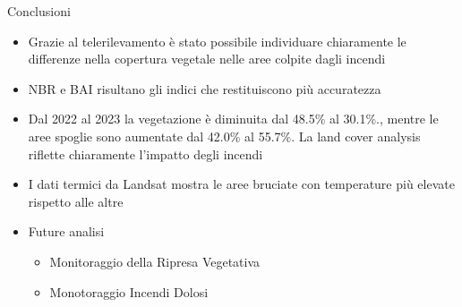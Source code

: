 \documentclass{beamer}  %
\begin{document}


                  


\begin{frame}{Conclusioni}
    \centering
    \small
    \begin{itemize}
    \item  Grazie al telerilevamento è stato possibile individuare chiaramente le differenze nella copertura vegetale nelle aree colpite dagli incendi
            \vspace{0.2cm}
    \item NBR e BAI risultano gli indici che restituiscono più accuratezza
                \vspace{0.2cm}
    \item Dal 2022 al 2023 la vegetazione è diminuita dal 48.5\% al 30.1\%., mentre le aree spoglie sono aumentate dal 42.0\% al 55.7\%. La land cover analysis riflette chiaramente l'impatto degli incendi
                \vspace{0.2cm}
    \item I dati termici da Landsat mostra le aree bruciate con temperature più elevate rispetto alle altre
                \vspace{0.2cm}
    \item Future analisi 
    \begin{itemize}
        \item Monitoraggio della Ripresa Vegetativa
         \item Monotoraggio Incendi Dolosi
    \end{itemize}
    \end{itemize}
\end{frame}
\end{document}
